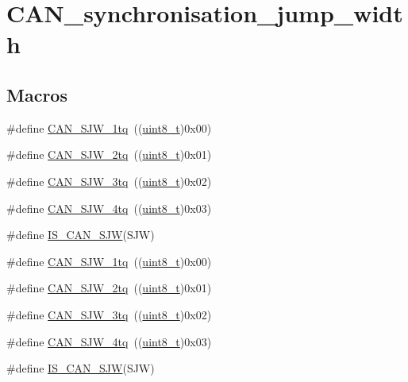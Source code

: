 \hypertarget{group___c_a_n__synchronisation__jump__width}{}\section{C\+A\+N\+\_\+synchronisation\+\_\+jump\+\_\+width}
\label{group___c_a_n__synchronisation__jump__width}
\subsection*{Macros}
\begin{DoxyCompactItemize}
\item 
\#define \hyperlink{group___c_a_n__synchronisation__jump__width_ga4e03d22ae683b63cb4df238449ec967c}{C\+A\+N\+\_\+\+S\+J\+W\+\_\+1tq}~((\hyperlink{_p_e___types_8h_aba7bc1797add20fe3efdf37ced1182c5}{uint8\+\_\+t})0x00)
\item 
\#define \hyperlink{group___c_a_n__synchronisation__jump__width_gad39e7656c555cc00bc4d7c1bff39916f}{C\+A\+N\+\_\+\+S\+J\+W\+\_\+2tq}~((\hyperlink{_p_e___types_8h_aba7bc1797add20fe3efdf37ced1182c5}{uint8\+\_\+t})0x01)
\item 
\#define \hyperlink{group___c_a_n__synchronisation__jump__width_gab4de740e2184aac71c2c8cba22a8ecd2}{C\+A\+N\+\_\+\+S\+J\+W\+\_\+3tq}~((\hyperlink{_p_e___types_8h_aba7bc1797add20fe3efdf37ced1182c5}{uint8\+\_\+t})0x02)
\item 
\#define \hyperlink{group___c_a_n__synchronisation__jump__width_ga7f26a36d478c7ba1a1441b369d62f693}{C\+A\+N\+\_\+\+S\+J\+W\+\_\+4tq}~((\hyperlink{_p_e___types_8h_aba7bc1797add20fe3efdf37ced1182c5}{uint8\+\_\+t})0x03)
\item 
\#define \hyperlink{group___c_a_n__synchronisation__jump__width_ga4e4f344712d3bcac1975318d4ab9a383}{I\+S\+\_\+\+C\+A\+N\+\_\+\+S\+JW}(S\+JW)
\item 
\#define \hyperlink{group___c_a_n__synchronisation__jump__width_ga4e03d22ae683b63cb4df238449ec967c}{C\+A\+N\+\_\+\+S\+J\+W\+\_\+1tq}~((\hyperlink{_p_e___types_8h_aba7bc1797add20fe3efdf37ced1182c5}{uint8\+\_\+t})0x00)
\item 
\#define \hyperlink{group___c_a_n__synchronisation__jump__width_gad39e7656c555cc00bc4d7c1bff39916f}{C\+A\+N\+\_\+\+S\+J\+W\+\_\+2tq}~((\hyperlink{_p_e___types_8h_aba7bc1797add20fe3efdf37ced1182c5}{uint8\+\_\+t})0x01)
\item 
\#define \hyperlink{group___c_a_n__synchronisation__jump__width_gab4de740e2184aac71c2c8cba22a8ecd2}{C\+A\+N\+\_\+\+S\+J\+W\+\_\+3tq}~((\hyperlink{_p_e___types_8h_aba7bc1797add20fe3efdf37ced1182c5}{uint8\+\_\+t})0x02)
\item 
\#define \hyperlink{group___c_a_n__synchronisation__jump__width_ga7f26a36d478c7ba1a1441b369d62f693}{C\+A\+N\+\_\+\+S\+J\+W\+\_\+4tq}~((\hyperlink{_p_e___types_8h_aba7bc1797add20fe3efdf37ced1182c5}{uint8\+\_\+t})0x03)
\item 
\#define \hyperlink{group___c_a_n__synchronisation__jump__width_ga4e4f344712d3bcac1975318d4ab9a383}{I\+S\+\_\+\+C\+A\+N\+\_\+\+S\+JW}(S\+JW)
\end{DoxyCompactItemize}


